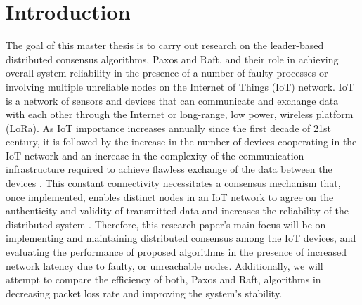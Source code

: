 \documentclass[oneside,12pt]{book}
\begin{document}
\chapter{Introduction}
\par The goal of this master thesis is to carry out research on the leader-based distributed consensus algorithms, Paxos and Raft, and their role in achieving overall system reliability in the presence of a number of faulty processes or involving multiple unreliable nodes on the Internet of Things (IoT) network. IoT is a network of sensors and devices that can communicate and exchange data with each other through the Internet or long-range, low power, wireless platform (LoRa). As IoT importance increases annually since the first decade of 21st century, it is followed by the increase in the number of devices cooperating in the IoT network and an increase in the complexity of the communication infrastructure required to achieve flawless exchange of the data between the devices \citep{ismail2019introductory}. This constant connectivity necessitates a consensus mechanism that, once implemented, enables distinct nodes in an IoT network to agree on the authenticity and validity of transmitted data and increases the reliability of the distributed system \citep{8328431}. Therefore, this research paper’s main focus will be on implementing and maintaining distributed consensus among the IoT devices, and evaluating the performance of proposed algorithms in the presence of increased network latency due to faulty, or unreachable nodes. Additionally, we will attempt to compare the efficiency of both, Paxos and Raft, algorithms in decreasing packet loss rate and improving the system’s stability. 
\end{document}
